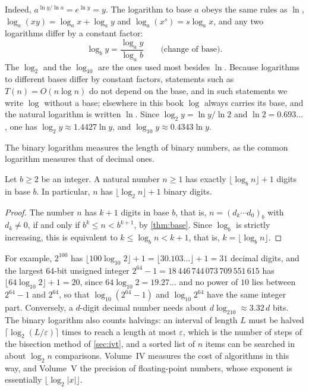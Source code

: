 Indeed, $a^{\ln y/\ln a}=e^{\ln y}=y$. The logarithm to base $a$ obeys the same rules as $\ln$, $\log_a(xy)=\log_ax+\log_ay$ and $\log_a(x^s)=s\log_ax$, and any two logarithms differ by a constant factor:
\[
\log_by=\frac{\log_ay}{\log_ab}\qquad\text{(change of base)}.
\]
The  $\log_2$ and the  $\log_{10}$ are the ones used most besides $\ln$. Because logarithms to different bases differ by constant factors, statements such as $T(n)=O(n\log n)$ do not depend on the base, and in such statements we write $\log$ without a base; elsewhere in this book $\log$ always carries its base, and the natural logarithm is written $\ln$. Since $\log_2y=\ln y/\ln2$ and $\ln2=0.693\ldots$, one has $\log_2y\approx1.4427\ln y$, and $\log_{10}y\approx0.4343\ln y$.

The binary logarithm measures the length of binary numbers, as the common logarithm measures that of decimal ones.

\begin{proposition}
\label{prop:digit-count}
Let $b\ge2$ be an integer. A natural number $n\ge1$ has exactly $\lfloor\log_bn\rfloor+1$ digits in base $b$. In particular, $n$ has $\lfloor\log_2n\rfloor+1$ binary digits.
\end{proposition}

\begin{proof}
The number $n$ has $k+1$ digits in base $b$, that is, $n=(d_k\cdots d_0)_b$ with $d_k\ne0$, if and only if $b^k\le n<b^{k+1}$, by \cref{thm:base}. Since $\log_b$ is strictly increasing, this is equivalent to $k\le\log_bn<k+1$, that is, $k=\lfloor\log_bn\rfloor$.
\end{proof}

For example, $2^{100}$ has $\lfloor100\log_{10}2\rfloor+1=\lfloor30.103\ldots\rfloor+1=31$ decimal digits, and the largest $64$-bit unsigned integer $2^{64}-1=18\,446\,744\,073\,709\,551\,615$ has $\lfloor64\log_{10}2\rfloor+1=20$, since $64\log_{10}2=19.27\ldots$ and no power of $10$ lies between $2^{64}-1$ and $2^{64}$, so that $\log_{10}(2^{64}-1)$ and $\log_{10}2^{64}$ have the same integer part. Conversely, a $d$-digit decimal number needs about $d\log_210\approx3.32\,d$ bits. The binary logarithm also counts halvings: an interval of length $L$ must be halved $\lceil\log_2(L/\varepsilon)\rceil$ times to reach a length at most $\varepsilon$, which is the number of steps of the bisection method of \cref{sec:ivt}, and a sorted list of $n$ items can be searched in about $\log_2n$ comparisons. Volume~IV measures the cost of algorithms in this way, and Volume~V the precision of floating-point numbers, whose exponent is essentially $\lfloor\log_2|x|\rfloor$.

